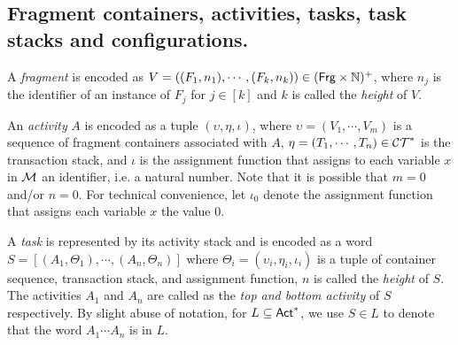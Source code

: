 \subsection*{Fragment containers, activities, tasks, task stacks and configurations.}

A \emph{fragment \container} is encoded as 
$V = ((F_1, n_1), \cdots, (F_k, n_k)) \in ({\sf Frg} \times {\mathbb{N} })^+ $, where $n_j$ is the identifier of an instance of $F_j$ for $j \in [k]$ and $k$ is called the \emph{height} of $V$.

%
An \emph{activity} $A$ %
is encoded as a tuple $(\upsilon, \eta, \iota)$, where %
$\upsilon = (V_1, \cdots, V_m)$  is a sequence of fragment containers associated with $A$, $\eta= (T_1, \cdots, T_n) \in \mathcal{CT}^*$ is the transaction stack, and $\iota$ is the assignment function that assigns to each variable $x$ in ${\mathcal{M} }$ an identifier, i.e. a natural number. Note that it is possible that $m=0$ and/or $n=0$. For technical convenience, let $\iota_0$ denote the assignment function that assigns each variable $x$ the value $0$.



%

A \emph{task} is represented by its activity stack and is encoded as a word $S= [(A_1, \Theta_1), \cdots, (A_n, \Theta_n)]$ where $\Theta_i = (\upsilon_i, \eta_i, \iota_i)$ is a tuple of container sequence, transaction stack, and assignment function, %
$n$ is called the \emph{height} of $S$. The activities $A_1$ and $A_n$ are called as the \emph{top and bottom activity} of $S$ respectively. By slight abuse of notation, for $L \subseteq {\sf Act}^*$, we use $S \in L$ to denote  that the word $A_1 \cdots A_n$ is in $L$.

